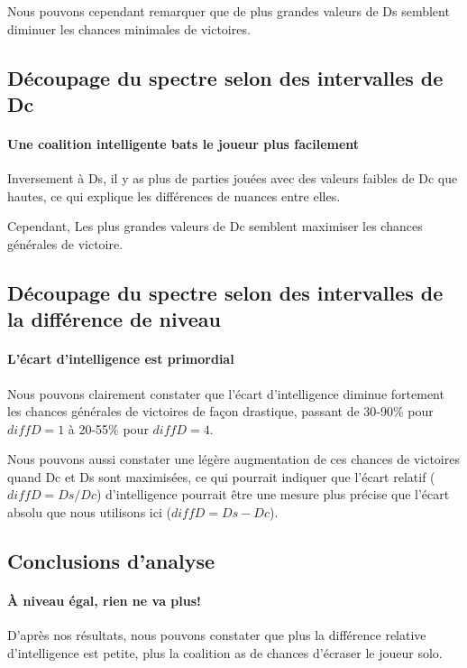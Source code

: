Nous pouvons cependant remarquer que de plus grandes valeurs de Ds semblent diminuer les chances minimales de victoires.

\subsection{Découpage du spectre selon des intervalles de Dc}
\paragraph{Une coalition intelligente bats le joueur plus facilement}
Inversement à Ds, il y as plus de parties jouées avec des valeurs faibles de Dc que hautes, ce qui explique les différences de nuances entre elles.

Cependant, Les plus grandes valeurs de Dc semblent maximiser les chances générales de victoire.


\subsection{Découpage du spectre selon des intervalles de la différence de niveau}
\paragraph{L'écart d'intelligence est primordial}
Nous pouvons clairement constater que l'écart d'intelligence diminue fortement les chances générales de victoires de façon drastique, passant de 30-90\% pour $diffD = 1$ à 20-55\% pour $diffD = 4$.

Nous pouvons aussi constater une légère augmentation de ces chances de victoires quand Dc et Ds sont maximisées, ce qui pourrait indiquer que l'écart relatif ($diffD = Ds/Dc$) d'intelligence pourrait être une mesure plus précise que l'écart absolu que nous utilisons ici ($diffD = Ds - Dc$).

\subsection{Conclusions d'analyse}

\paragraph{À niveau égal, rien ne va plus!}
D'après nos résultats, nous pouvons constater que plus la différence relative d'intelligence est petite, plus la coalition as de chances d'écraser le joueur solo.

